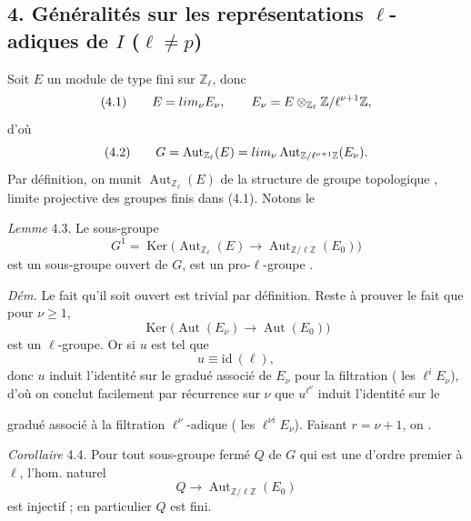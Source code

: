 \documentclass[11pt,a4paper]{article}
\begin{document}
\subsection*{4. Généralités sur les représentations $\ell$-adiques de $I$ ($\ell \neq p$)}

Soit $E$ un module de type fini sur $\mathbb{Z}_\ell$, donc
\[
  (4.1) \qquad E = \varprojlim_\nu E_\nu , \qquad E_\nu = E \otimes_{\mathbb{Z}_\ell} \mathbb{Z}/\ell^{\nu+1}\mathbb{Z} ,
\]
d'où
\[
  (4.2) \qquad G = \operatorname{Aut}_{\mathbb{Z}_\ell}(E) = \varprojlim_\nu \operatorname{Aut}_{\mathbb{Z}/\ell^{\nu+1}\mathbb{Z}}(E_\nu) .
\]
Par définition, on munit $\operatorname{Aut}_{\mathbb{Z}_\ell}(E)$ de la structure de groupe topologique , limite projective des groupes finis  dans (4.1). Notons le

\emph{Lemme} 4.3. Le  sous-groupe 
\[
  G^{1} = \operatorname{Ker}\bigl( \operatorname{Aut}_{\mathbb{Z}_\ell}(E) \to \operatorname{Aut}_{\mathbb{Z}/\ell\mathbb{Z}}(E_0) \bigr)
\]
est un sous-groupe ouvert de $G$,  est  un pro-$\ell$-groupe \struck{\uncertain{\ill{}}}.

\emph{Dém.} Le fait qu'il soit ouvert est trivial par définition. Reste à prouver le fait que pour $\nu \geq 1$,
\[
  \operatorname{Ker}\bigl( \operatorname{Aut}(E_\nu) \to \operatorname{Aut}(E_0) \bigr)
\]
est un $\ell$-groupe. Or si $u$ est tel que
\[
  u \equiv \mathrm{id} \ (\ell) ,
\]
donc $u$ induit l'identité sur le gradué associé de $E_\nu$ pour la filtration  ( les $\ell^{i} E_\nu$), d'où on conclut facilement par récurrence sur $\nu$ que $u^{\ell^{\nu}}$ induit l'identité sur le

gradué associé à la filtration $\ell^{\nu}$-adique ( les $\ell^{\nu i} E_\nu$). Faisant $r = \nu + 1$, on .

\emph{Corollaire} 4.4. Pour tout \struck{\ill{}} sous-groupe \struck{\ill{}} fermé $Q$ de $G$ qui est une    d'ordre premier à $\ell$, l'hom. naturel
\[
  Q \longrightarrow \operatorname{Aut}_{\mathbb{Z}/\ell\mathbb{Z}}(E_0)
\]
est injectif ; en particulier $Q$ est fini.
\end{document}
